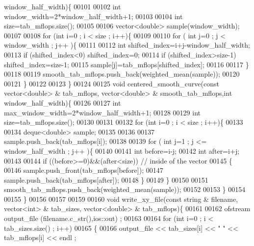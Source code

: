 \begin{DoxyCode}
      window\_half\_width)\{
00101   
00102   \textcolor{keywordtype}{int} window\_width=2*window\_half\_width+1;
00103 
00104   \textcolor{keywordtype}{int} size=tab\_mflops.size();
00105 
00106   vector<double> sample(window\_width);
00107   
00108   \textcolor{keywordflow}{for} (\textcolor{keywordtype}{int} i=0 ; i < size ; i++)\{
00109     
00110     \textcolor{keywordflow}{for} ( \textcolor{keywordtype}{int} j=0 ; j < window\_width ; j++ )\{
00111       
00112       \textcolor{keywordtype}{int} shifted\_index=i+j-window\_half\_width;
00113       \textcolor{keywordflow}{if} (shifted\_index<0) shifted\_index=0;
00114       \textcolor{keywordflow}{if} (shifted\_index>size-1) shifted\_index=size-1;
00115       sample[j]=tab\_mflops[shifted\_index];
00116       
00117     \}
00118 
00119     smooth\_tab\_mflops.push\_back(weighted\_mean(sample));
00120 
00121   \}
00122 
00123 \}
00124 
00125 \textcolor{keywordtype}{void} centered\_smooth\_curve(\textcolor{keyword}{const} vector<double> & tab\_mflops, vector<double> & smooth\_tab\_mflops,\textcolor{keywordtype}{int} 
      window\_half\_width)\{
00126   
00127   \textcolor{keywordtype}{int} max\_window\_width=2*window\_half\_width+1;
00128 
00129   \textcolor{keywordtype}{int} size=tab\_mflops.size();
00130 
00131   
00132   \textcolor{keywordflow}{for} (\textcolor{keywordtype}{int} i=0 ; i < size ; i++)\{
00133 
00134     deque<double> sample;
00135 
00136     
00137     sample.push\_back(tab\_mflops[i]);
00138 
00139     \textcolor{keywordflow}{for} ( \textcolor{keywordtype}{int} j=1 ; j <= window\_half\_width ; j++ )\{
00140       
00141       \textcolor{keywordtype}{int} before=i-j;
00142       \textcolor{keywordtype}{int} after=i+j;
00143       
00144       \textcolor{keywordflow}{if} ((before>=0)&&(after<size)) \textcolor{comment}{// inside of the vector}
00145     \{ 
00146       sample.push\_front(tab\_mflops[before]);
00147       sample.push\_back(tab\_mflops[after]);
00148     \}
00149     \}
00150     
00151     smooth\_tab\_mflops.push\_back(weighted\_mean(sample));
00152     
00153   \}
00154 
00155 \}
00156 
00157 
00159 
00160 \textcolor{keywordtype}{void} write\_xy\_file(\textcolor{keyword}{const} \textcolor{keywordtype}{string} & filename, vector<int> & tab\_sizes, vector<double> & tab\_mflops)\{
00161 
00162   ofstream output\_file (filename.c\_str(),ios::out) ;
00163   
00164   \textcolor{keywordflow}{for} (\textcolor{keywordtype}{int} i=0 ; i < tab\_sizes.size() ; i++)
00165     \{
00166       output\_file << tab\_sizes[i] << \textcolor{stringliteral}{" "} <<  tab\_mflops[i] << endl ;

\end{DoxyCode}
